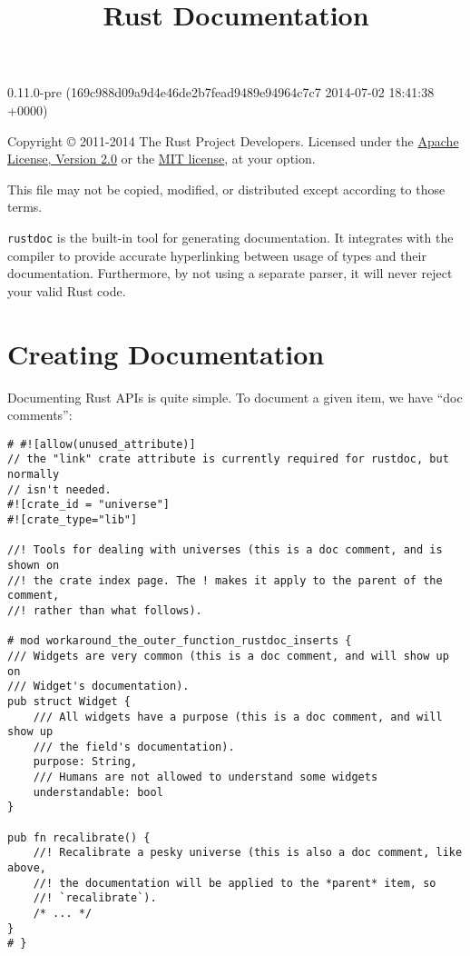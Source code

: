 \documentclass[]{article}
\title{Rust Documentation}
\begin{document}
\maketitle

0.11.0-pre (169c988d09a9d4e46de2b7fead9489e94964c7c7 2014-07-02 18:41:38 +0000)

Copyright © 2011-2014 The Rust Project Developers. Licensed under the
\href{http://www.apache.org/licenses/LICENSE-2.0}{Apache License,
Version 2.0} or the \href{http://opensource.org/licenses/MIT}{MIT
license}, at your option.

This file may not be copied, modified, or distributed except according
to those terms.

{
\hypersetup{linkcolor=black}
\setcounter{tocdepth}{3}
\tableofcontents
}
\texttt{rustdoc} is the built-in tool for generating documentation. It
integrates with the compiler to provide accurate hyperlinking between
usage of types and their documentation. Furthermore, by not using a
separate parser, it will never reject your valid Rust code.

\section{Creating Documentation}\label{creating-documentation}

Documenting Rust APIs is quite simple. To document a given item, we have
``doc comments'':

\begin{verbatim}
# #![allow(unused_attribute)]
// the "link" crate attribute is currently required for rustdoc, but normally
// isn't needed.
#![crate_id = "universe"]
#![crate_type="lib"]

//! Tools for dealing with universes (this is a doc comment, and is shown on
//! the crate index page. The ! makes it apply to the parent of the comment,
//! rather than what follows).

# mod workaround_the_outer_function_rustdoc_inserts {
/// Widgets are very common (this is a doc comment, and will show up on
/// Widget's documentation).
pub struct Widget {
    /// All widgets have a purpose (this is a doc comment, and will show up
    /// the field's documentation).
    purpose: String,
    /// Humans are not allowed to understand some widgets
    understandable: bool
}

pub fn recalibrate() {
    //! Recalibrate a pesky universe (this is also a doc comment, like above,
    //! the documentation will be applied to the *parent* item, so
    //! `recalibrate`).
    /* ... */
}
# }
\end{verbatim}
\end{document}

